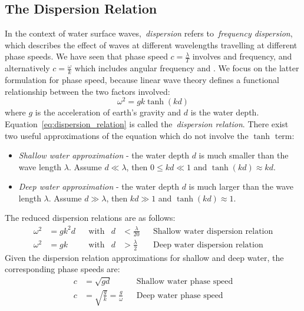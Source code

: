 \subsection{The Dispersion Relation}
\label{sec:dispersion_relation}

In the context of water surface waves,~\emph{dispersion} refers to~\emph{frequency dispersion}, which describes
the effect of waves at different wavelengths travelling at different phase speeds. We have seen that
phase speed $c = \frac{\lambda}{T}$ involves \wavelength and frequency, and alternatively $c = \frac{\omega}{k}$
which includes angular frequency and \wavenumber. We focus on the latter formulation for phase speed, because
linear wave theory defines a functional relationship between the two factors involved:
\begin{equation}
\label{eq:dispersion_relation}
 \omega^2 = gk\tanh(kd)
\end{equation}
%
where $g$ is the acceleration of earth's gravity and $d$ is the water depth. Equation~\ref{eq:dispersion_relation}
is called the~\emph{dispersion relation}.
There exist two useful approximations of the equation which do not involve the $\tanh$ term:
\begin{itemize}
 \item \emph{Shallow water approximation} - the water depth $d$ is much smaller than the wave length $\lambda$.
 Assume $d \ll \lambda$, then $0 \leq kd \ll 1$ and $\tanh(kd) \approx kd$.
 \item \emph{Deep water approximation} - the water depth $d$ is much larger than the wave length $\lambda$.
 Assume $d \gg \lambda$, then $kd \gg 1$ and $\tanh(kd) \approx 1$.
\end{itemize}
%
The reduced dispersion relations are as follows:
\begin{align*}
\omega^2 & = gk^2d && \text{with} & d &< \frac{\lambda}{20}  && \text{Shallow 
water dispersion relation}\\
\omega^2 & = gk    && \text{with} & d &> \frac{\lambda}{2} && \text{Deep water 
dispersion relation}
\end{align*}
%
Given the dispersion relation approximations for shallow and deep water, the corresponding
phase speeds are:
\begin{align}
 \label{eq:phase_speed_shallow_water} c &= \sqrt{gd} && \text{Shallow water phase speed}\\
  \label{eq:phase_speed_deep_water}   c &= \sqrt{\frac{g}{k}} = \frac{g}{\omega} && \text{Deep water phase speed}
\end{align}
